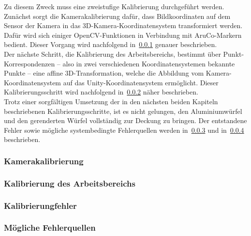 Zu diesem Zweck muss eine zweistufige Kalibrierung durchgeführt werden. Zunächst sorgt die Kamerakalibrierung dafür, dass Bildkoordinaten auf dem Sensor der Kamera in das 3D-Kamera-Koordinatensystem transformiert werden. Dafür wird sich einiger OpenCV-Funktionen in Verbindung mit AruCo-Markern bedient. Dieser Vorgang wird nachfolgend in~\ref{sec:camCalib} genauer beschrieben.\\
Der nächste Schritt, die Kalibrierung des Arbeitsbereichs, bestimmt über Punkt-Korrespondenzen -- also in zwei verschiedenen Koordinatensystemen bekannte Punkte -- eine affine 3D-Transformation, welche die Abbildung vom Kamera-Koordinatensystem auf das Unity-Koordinatensystem ermöglicht. Dieser Kalibrierungsschritt wird nachfolgend in~\ref{sec:planeCalib} näher beschrieben.\\
Trotz einer sorgfältigen Umsetzung der in den nächsten beiden Kapiteln beschriebenen Kalibrierungsschritte, ist es nicht gelungen, den Aluminiumwürfel und den gerenderten Würfel vollständig zur Deckung zu bringen. Der entstandene Fehler sowie mögliche systembedingte Fehlerquellen werden in~\ref{sec:calibError} und in~\ref{sec:calibErrorSources} beschrieben. 

\subsubsection{Kamerakalibrierung}\label{sec:camCalib}



\subsubsection{Kalibrierung des Arbeitsbereichs}\label{sec:planeCalib}
\subsubsection{Kalibrierungfehler} \label{sec:calibError}
\subsubsection{Mögliche Fehlerquellen} \label{sec:calibErrorSources}


